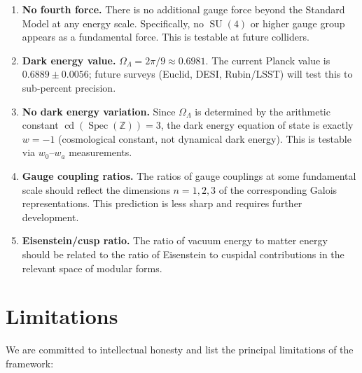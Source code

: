 \documentclass[12pt,a4paper]{article}
\theoremstyle{definition}
\newcommand{\Spec}{\operatorname{Spec}}
\newcommand{\SU}{\operatorname{SU}}
\newcommand{\cd}{\operatorname{cd}}
\newcommand{\Z}{\mathbb{Z}}
\newcommand{\OmL}{\Omega_\Lambda}
\begin{document}
\begin{enumerate}
  \item \textbf{No fourth force.}
    There is no additional gauge force beyond the Standard Model
    at any energy scale.
    Specifically, no $\SU(4)$ or higher gauge group appears
    as a fundamental force.
    This is testable at future colliders.

  \item \textbf{Dark energy value.}
    $\OmL = 2\pi/9 \approx 0.6981$.
    The current Planck value is $0.6889\pm0.0056$;
    future surveys (Euclid, DESI, Rubin/LSST) will test this
    to sub-percent precision.

  \item \textbf{No dark energy variation.}
    Since $\OmL$ is determined by the arithmetic constant
    $\cd(\Spec(\Z))=3$, the dark energy equation of state
    is exactly $w=-1$ (cosmological constant, not
    dynamical dark energy).
    This is testable via $w_0$--$w_a$ measurements.

  \item \textbf{Gauge coupling ratios.}
    The ratios of gauge couplings at some fundamental scale
    should reflect the dimensions $n=1,2,3$ of the corresponding
    Galois representations.
    This prediction is less sharp and requires further development.

  \item \textbf{Eisenstein/cusp ratio.}
    The ratio of vacuum energy to matter energy should
    be related to the ratio of Eisenstein to cuspidal
    contributions in the relevant space of modular forms.
\end{enumerate}

\section{Limitations}\label{sec:limitations}

We are committed to intellectual honesty and list the
principal limitations of the framework:
\end{document}

